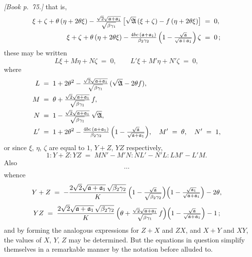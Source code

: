 \documentclass[11pt]{article}
\providecommand{\fA}{\mathfrak{A}}
\begin{document}
\noindent\emph{[Book p.~75.]} that is,
\begin{align*}
\xi + \zeta + \theta\,(\eta + 2\theta\xi) - \tfrac{\sqrt{2}\sqrt{\mathfrak{a} + \mathfrak{a}_{1}}}{\sqrt{\beta\gamma_{1}}}\,\bigl[\sqrt{\fA}\,(\xi + \zeta) - f\,(\eta + 2\theta\xi)\bigr] &\;=\; 0,\\
\xi + \zeta + \theta\,(\eta + 2\theta\xi) - \tfrac{4bc\,(\mathfrak{a} + \mathfrak{a}_{1})}{\beta_{2}\gamma_{2}}\,\Bigl(1 - \tfrac{\sqrt{\mathfrak{a}}}{\sqrt{\mathfrak{a} + \mathfrak{a}_{1}}}\Bigr)\,\zeta &\;=\; 0\,;
\end{align*}
these may be written
\[
L\xi + M\eta + N\zeta \;=\; 0,\qquad L'\xi + M'\eta + N'\zeta \;=\; 0,
\]
where
\begin{align*}
L &\;=\; 1 + 2\theta^{2} - \tfrac{\sqrt{2}\sqrt{\mathfrak{a} + \mathfrak{a}_{1}}}{\sqrt{\beta\gamma_{1}}}\,(\sqrt{\fA} - 2\theta f),\\
M &\;=\; \theta + \tfrac{\sqrt{2}\sqrt{\mathfrak{a} + \mathfrak{a}_{1}}}{\sqrt{\beta\gamma_{1}}}\,f,\\
N &\;=\; 1 - \tfrac{\sqrt{2}\sqrt{\mathfrak{a} + \mathfrak{a}_{1}}}{\sqrt{\beta\gamma_{1}}}\,\sqrt{\fA},\\
L' &\;=\; 1 + 2\theta^{2} - \tfrac{4bc\,(\mathfrak{a} + \mathfrak{a}_{1})}{\beta_{2}\gamma_{2}}\,\Bigl(1 - \tfrac{\sqrt{\mathfrak{a}}}{\sqrt{\mathfrak{a} + \mathfrak{a}_{1}}}\Bigr),\quad M' \;=\; \theta,\quad N' \;=\; 1,
\end{align*}
or since $\xi$, $\eta$, $\zeta$ are equal to $1$, $Y + Z$, $YZ$ respectively,
\[
1 : Y + Z : YZ \;=\; MN' - M'N : NL' - N'L : LM' - L'M.
\]
Also
\[
\cdots
\]
whence
\[
Y + Z \;=\; -\frac{2\sqrt{2}\sqrt{\mathfrak{a} + \mathfrak{a}_{1}}\,\sqrt{\beta_{2}\gamma_{2}}}{K}\,\Bigl(1 - \tfrac{\sqrt{\mathfrak{a}}}{\sqrt{\beta_{2}\gamma_{2}}}\Bigr)\Bigl(1 - \tfrac{\sqrt{\mathfrak{a}_{1}}}{\sqrt{\mathfrak{a} + \mathfrak{a}_{1}}}\Bigr) - 2\theta,
\]
\[
YZ \;=\; \frac{2\sqrt{2}\sqrt{\mathfrak{a} + \mathfrak{a}_{1}}\,\sqrt{\beta_{2}\gamma_{2}}}{K}\,\Bigl(\theta + \tfrac{\sqrt{2}\sqrt{\mathfrak{a} + \mathfrak{a}_{1}}}{\sqrt{\beta\gamma_{1}}}\,f\Bigr)\Bigl(1 - \tfrac{\sqrt{\mathfrak{a}}}{\sqrt{\mathfrak{a} + \mathfrak{a}_{1}}}\Bigr) - 1\,;
\]
and by forming the analogous expressions for $Z + X$ and $ZX$, and $X + Y$ and $XY$, the values of $X$, $Y$, $Z$ may be determined. But the equations in question simplify themselves in a remarkable manner by the notation before alluded to.

\bigskip
\end{document}
